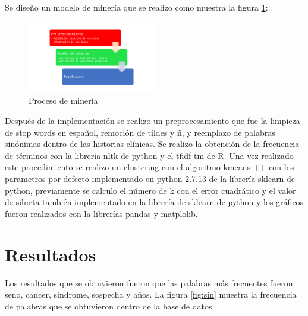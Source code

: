 Se diseño un modelo de minería que se realizo como muestra la figura \ref{fig:mineria}:

\begin{figure}[H]
	\centering
	\includegraphics[width=0.5\textwidth]{Kap4/pipelinemineria}
	\caption{Proceso de minería} \label{fig:mineria}
\end{figure} 

Después de la implementación se realizo un preprocesamiento que fue la limpieza de stop words en español, remoción de tildes y ñ, y reemplazo de palabras sinónimas dentro de las historias clínicas. Se realizo la obtención de la frecuencia de términos con la librería nltk de python y el tfidf tm de R. Una vez realizado este procedimiento se realizo un clustering con el algoritmo kmeans ++  con los parametros por defecto implementado en python 2.7.13 de la librería sklearn de python, previamente se calculo el número de k con el error cuadrático y el valor de silueta también implementado en la librería de sklearn de python y los gráficos fueron realizados con la librerías pandas y matplolib.
 
\section{Resultados}

Los resultados que se obtuvieron fueron que las palabras más frecuentes fueron seno, cancer, sindrome, sospecha y años. La figura \ref{fig:sin} muestra la frecuencia de palabras que se obtuvieron dentro de la base de datos.

